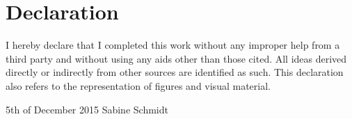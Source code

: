 \thispagestyle{empty}
\section*{Declaration}

I hereby declare that I completed this work without any improper help from a third party and without using any aids other than those cited. All ideas derived directly or indirectly from other sources are identified as such. This declaration also refers to the representation of figures and visual material.




\vspace{3cm}
5th of December 2015 \hfill Sabine Schmidt
